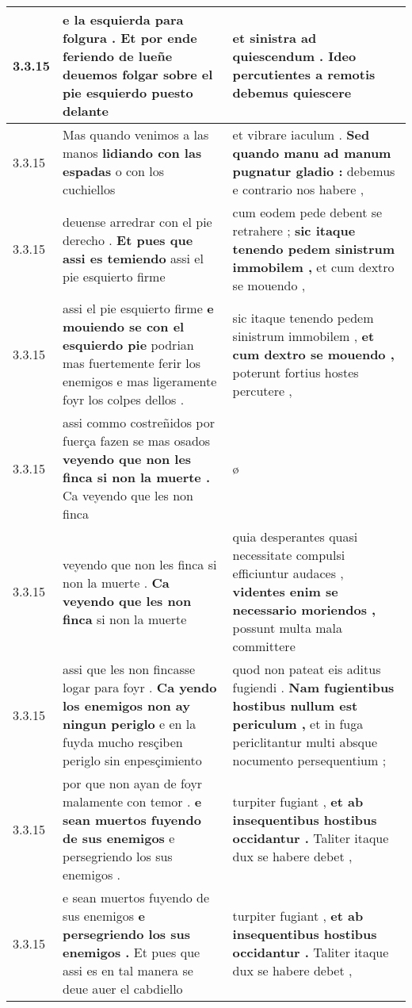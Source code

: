 \begin{tabular}{|p{1cm}|p{6.5cm}|p{6.5cm}|}
3.3.15 & e la esquierda para folgura . \textbf{ Et por ende feriendo de lueñe } deuemos folgar sobre el pie esquierdo puesto delante & et sinistra ad quiescendum . \textbf{ Ideo percutientes a remotis debemus } quiescere \\\hline
3.3.15 & Mas quando venimos a las manos \textbf{ lidiando con las espadas } o con los cuchiellos & et vibrare iaculum . \textbf{ Sed quando manu ad manum pugnatur gladio : } debemus e contrario nos habere , \\\hline
3.3.15 & deuense arredrar con el pie derecho . \textbf{ Et pues que assi es temiendo } assi el pie esquierto firme & cum eodem pede debent se retrahere ; \textbf{ sic itaque tenendo pedem sinistrum immobilem , } et cum dextro se mouendo , \\\hline
3.3.15 & assi el pie esquierto firme \textbf{ e mouiendo se con el esquierdo pie } podrian mas fuertemente ferir los enemigos e mas ligeramente foyr los colpes dellos . & sic itaque tenendo pedem sinistrum immobilem , \textbf{ et cum dextro se mouendo , } poterunt fortius hostes percutere , \\\hline
3.3.15 & assi commo costreñidos por fuerça fazen se mas osados \textbf{ veyendo que non les finca si non la muerte . } Ca veyendo que les non finca & ø \\\hline
3.3.15 & veyendo que non les finca si non la muerte . \textbf{ Ca veyendo que les non finca } si non la muerte & quia desperantes quasi necessitate compulsi efficiuntur audaces , \textbf{ videntes enim se necessario moriendos , } possunt multa mala committere \\\hline
3.3.15 & assi que les non fincasse logar para foyr . \textbf{ Ca yendo los enemigos non ay ningun periglo } e en la fuyda mucho resçiben periglo sin enpesçimiento & quod non pateat eis aditus fugiendi . \textbf{ Nam fugientibus hostibus nullum est periculum , } et in fuga periclitantur multi absque nocumento persequentium ; \\\hline
3.3.15 & por que non ayan de foyr malamente con temor . \textbf{ e sean muertos fuyendo de sus enemigos } e persegriendo los sus enemigos . & turpiter fugiant , \textbf{ et ab insequentibus hostibus occidantur . } Taliter itaque dux se habere debet , \\\hline
3.3.15 & e sean muertos fuyendo de sus enemigos \textbf{ e persegriendo los sus enemigos . } Et pues que assi es en tal manera se deue auer el cabdiello & turpiter fugiant , \textbf{ et ab insequentibus hostibus occidantur . } Taliter itaque dux se habere debet , \\\hline

\end{tabular}
